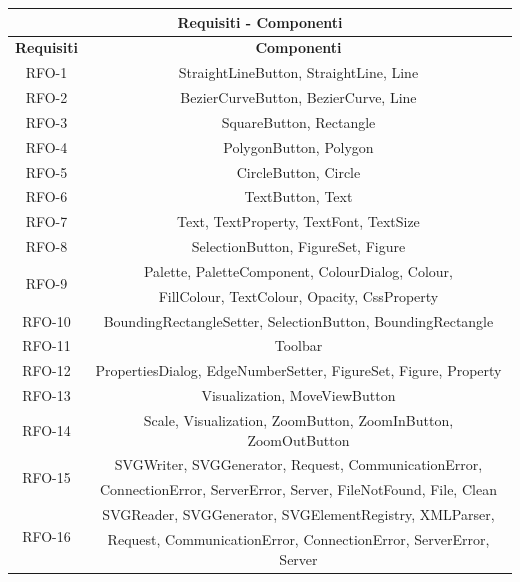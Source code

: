 \begin{table}[h]
\begin{center}
     \begin{tabular}
           {@{\extracolsep{\fill}}|c|c|}
      		\hline
           \multicolumn{2}{|c|}{ \textbf{Requisiti - Componenti} } \\
     \hline
      \textbf{Requisiti} & \textbf{Componenti} \\
      \hline
      RFO-1 & StraightLineButton, StraightLine, Line\\
      \hline
      RFO-2 & BezierCurveButton, BezierCurve, Line\\
      \hline
      RFO-3 & SquareButton, Rectangle\\
      \hline
      RFO-4 & PolygonButton, Polygon\\
      \hline
      RFO-5 & CircleButton, Circle\\
      \hline
      RFO-6 & TextButton, Text\\
      \hline
      RFO-7 & Text, TextProperty, TextFont, TextSize\\
      \hline
      RFO-8 & SelectionButton, FigureSet, Figure\\
      \hline
      \multirow{2}{*}{RFO-9} & Palette, PaletteComponent, ColourDialog, Colour,\\ & FillColour, TextColour, Opacity, CssProperty\\
      \hline
      RFO-10 & BoundingRectangleSetter, SelectionButton, BoundingRectangle\\
      \hline
      RFO-11 & Toolbar\\
      \hline
      RFO-12 & PropertiesDialog, EdgeNumberSetter, FigureSet, Figure, Property\\
      \hline
      RFO-13 & Visualization, MoveViewButton\\
      \hline
      RFO-14 & Scale, Visualization, ZoomButton, ZoomInButton, ZoomOutButton\\
      \hline
      \multirow{2}{*}{RFO-15} & SVGWriter, SVGGenerator, Request, CommunicationError, \\ & ConnectionError, ServerError, Server, FileNotFound, File, Clean\\
      \hline
      \multirow{2}{*}{RFO-16} & SVGReader, SVGGenerator, SVGElementRegistry, XMLParser, \\ & Request, CommunicationError, ConnectionError, ServerError, Server\\

\end{tabular}
\end{center}
\end{table}
